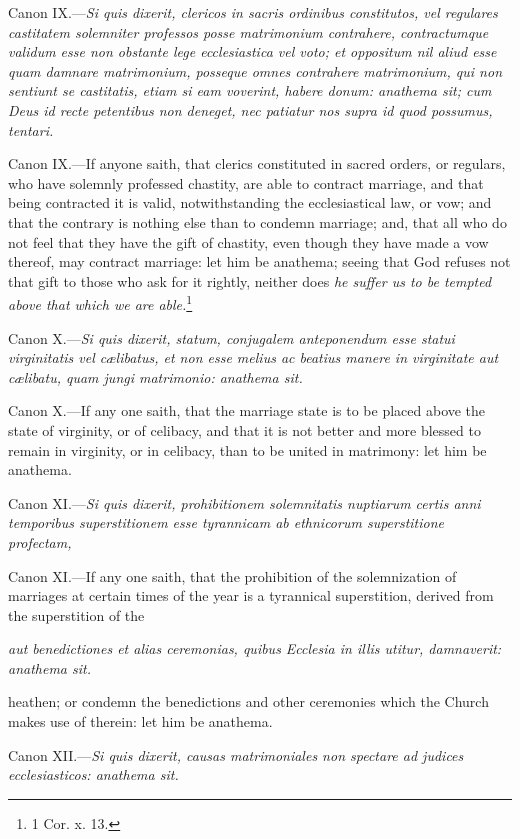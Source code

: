Canon IX.—\emph{Si quis dixerit, clericos in sacris ordinibus constitutos, vel regulares castitatem solemniter professos posse matrimonium contrahere, contractumque validum esse non obstante lege ecclesiastica vel voto; et oppositum nil aliud esse quam damnare matrimonium, posseque omnes contrahere matrimonium, qui non sentiunt se castitatis, etiam si eam voverint, habere donum: anathema sit; cum Deus id recte petentibus non deneget, nec patiatur nos supra id quod possumus, tentari.}

Canon IX.—If anyone saith, that clerics constituted in sacred orders, or regulars, who have solemnly professed chastity, are able to contract marriage, and that being contracted it is valid, notwithstanding the ecclesiastical law, or vow; and that the contrary is nothing else than to condemn marriage; and, that all who do not feel that they have the gift of chastity, even though they have made a vow thereof, may contract marriage: let him be anathema; seeing that God refuses not that gift to those who ask for it rightly, neither does \emph{he suffer us to be tempted above that which we are able.}\footnote{\par   1 Cor. x. 13.}

Canon X.—\emph{Si quis dixerit, statum, conjugalem anteponendum esse statui virginitatis vel cælibatus, et non esse melius ac beatius manere in virginitate aut cælibatu, quam jungi matrimonio: anathema sit.}

Canon X.—If any one saith, that the marriage state is to be placed above the state of virginity, or of celibacy, and that it is not better and more blessed to remain in virginity, or in celibacy, than to be united in matrimony: let him be anathema.

Canon XI.—\emph{Si quis dixerit, prohibitionem solemnitatis nuptiarum certis anni temporibus superstitionem esse tyrannicam ab ethnicorum superstitione profectam, }

Canon XI.—If any one saith, that the prohibition of the solemnization of marriages at certain times of the year is a tyrannical superstition, derived from the superstition of the

\emph{aut benedictiones et alias ceremonias, quibus Ecclesia in illis utitur, damnaverit: anathema sit.}

heathen; or condemn the benedictions and other ceremonies which the Church makes use of therein: let him be anathema.

Canon XII.—\emph{Si quis dixerit, causas matrimoniales non spectare ad judices ecclesiasticos: anathema sit.}

